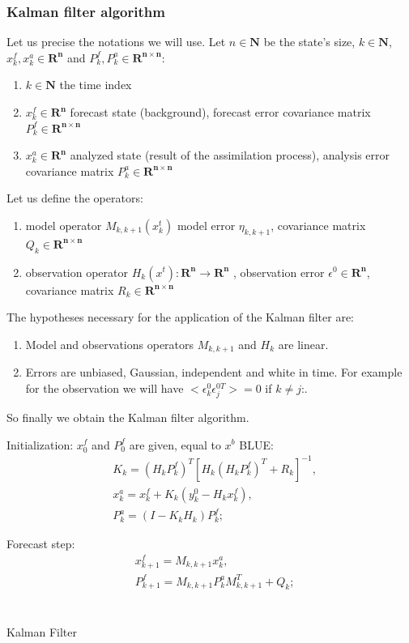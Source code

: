 \subsubsection{Kalman filter algorithm}
Let us precise the notations we will use.
\newline
\noindent Let $n\in \mathbf{N}$ be the state's size, $k\in \mathbf{N}$, $x_k^f ,x_k^a\in \mathbf{R^n}$ and $P_k^f,P_k^a \in \mathbf{R^{n\times n}}$:
 \begin{enumerate}[label=\textbullet]
		\item $k\in \mathbf{N} $ the time index
		\item $x_{k}^{f}\in \mathbf{R^n}$ forecast state (background), forecast error covariance matrix $P_{k}^{f}\in \mathbf{R^{n\times n}}$
		\item $x_{k}^{a}\in \mathbf{R^n}$ analyzed state (result of the assimilation process), analysis error covariance matrix $P_{k}^{a}\in \mathbf{R^{n\times n}}$
	\end{enumerate}
\noindent Let us define the operators:
    \begin{enumerate}[label=\textbullet]
		\item model operator $ M_{k,k+1}(x_{k}^{t}) $ model error $\eta
		_{k,k+1}$, covariance matrix $Q_k\in \mathbf{R^{n\times n}}$
		\item observation operator $ H_k (x^t ): \mathbf{R^n} \rightarrow \mathbf{R^n} $ , observation error $\epsilon^0\in \mathbf{R^n}$, covariance matrix $R_k\in \mathbf{R^{n\times n}}$
	\end{enumerate}
\noindent The hypotheses necessary for the application of the Kalman filter are:
    \begin{enumerate}[label=\textbullet]
		\item Model and observations operators $M_{k,k+1}$ and $H_k$ are linear.
		\item Errors are unbiased, Gaussian, independent and white in time. For example for the observation we will have $<\epsilon_k^0\epsilon_j^{0T}>=0$ if $k\ne j$:.
	\end{enumerate}
So finally we obtain the Kalman filter algorithm.
\IncMargin{1em}
\begin{algorithm}
\BlankLine
Initialization: $x_0^f$ and $P_0^f$ are given, equal to $x^b$ \;
BLUE:
\newline
$$\begin{aligned} &K_k=(H_kP_k^f)^T[H_k(H_kP_k^f)^T+R_k]^{-1}, \\
&x_k^a=x_k^f+K_k(y_k^0-H_kx_k^f), \\
&P_k^a=(I-K_kH_k)P_k^f; \;
\end{aligned}$$

Forecast step:
$$\begin{aligned} 
&x_{k+1}^f=M_{k,k+1}x_k^a, \\
&P_{k+1}^f=M_{k,k+1}P_k^aM_{k,k+1}^T+Q_k;\\
\end{aligned}$$\
\caption{Kalman Filter}\label{enkf}
\end{algorithm}
